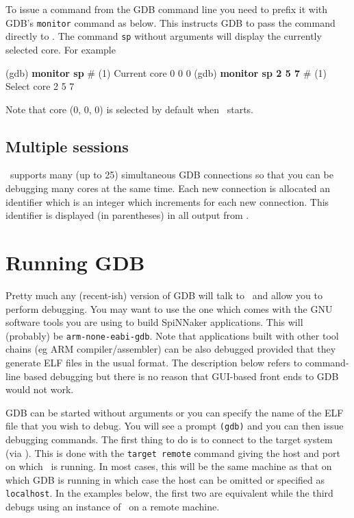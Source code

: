 To issue a command from the GDB command line you need to prefix it
with GDB's \texttt{monitor} command as below. This instructs GDB to
pass the command directly to \gdbspin. The command \texttt{sp} without
arguments will display the currently selected core. For example

\begin{shell}
(gdb) \textbf{monitor sp}
#  (1) Current core 0 0 0
(gdb) \textbf{monitor sp 2 5 7}
#  (1) Select core 2 5 7
\end{shell}

Note that core (0, 0, 0) is selected by default when \gdbspin\
starts.

\subsection{Multiple sessions}

\gdbspin\ supports many (up to 25) simultaneous GDB connections
so that you can be debugging many cores at the same time. Each new
connection is allocated an identifier which is an integer which
increments for each new connection. This identifier is displayed
(in parentheses) in all output from \gdbspin.

\section{Running GDB}

Pretty much any (recent-ish) version of GDB will talk to \gdbspin\ and
allow you to perform debugging.  You may want to use the one which
comes with the GNU software tools you are using to build SpiNNaker
applications. This will (probably) be \texttt{arm-none-eabi-gdb}.
Note that applications built with other tool chains (eg ARM
compiler/assembler) can be also debugged provided that they generate
ELF files in the usual format. The description below refers to
command-line based debugging but there is no reason that GUI-based
front ends to GDB would not work.

GDB can be started without arguments or you can specify the name of
the ELF file that you wish to debug. You will see a
prompt \texttt{(gdb)} and you can then issue debugging commands. The
first thing to do is to connect to the target system
(via \gdbspin). This is done with the \texttt{target remote} command
giving the host and port on which \gdbspin\ is running.  In most
cases, this will be the same machine as that on which GDB is running
in which case the host can be omitted or specified
as \texttt{localhost}. In the examples below, the first two are
equivalent while the third debugs using an instance of
\gdbspin\ on a remote machine.

